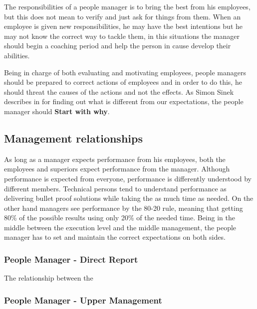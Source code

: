 The responsibilities of a people manager is to bring the best from his employees, but this does not mean to verify and just ask for things from them. When an employee is given new responsibilities, he may have the best intentions but he may not know the correct way to tackle them, in this situations the manager should begin a coaching period and help the person in cause develop their abilities.

Being in charge of both evaluating and motivating employees, people managers should be prepared to correct actions of employees and in order to do this, he should threat the causes of the actions and not the effects. As Simon Sinek describes in \cite{why} for finding out what is different from our expectations, the people manager should \textbf{Start with why}.
\subsection{Management relationships}
\label{subsec:relationships}
As long as a manager expects performance from his employees, both the employees and superiors expect performance from the manager. Although performance is expected from everyone, performance is differently understood by different members. Technical persons tend to understand performance as delivering bullet proof solutions while taking the as much time as needed. On the other hand managers see performance by the 80-20 rule, meaning that getting 80\% of the possible results using only 20\% of the needed time. Being in the middle between the execution level and the middle management, the people manager has to set and maintain the correct expectations on both sides.

\subsubsection{People Manager - Direct Report}
\label{sub-subsec:pmdr}
 \newline
The relationship between the 
\subsubsection{People Manager - Upper Management}
\label{sub-subsec:pmum}
 \newline

